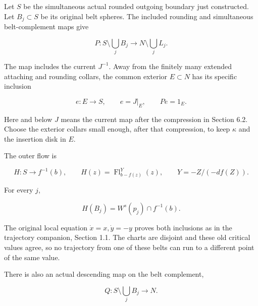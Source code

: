 Let \(S\) be the simultaneous actual rounded outgoing boundary just constructed. Let \(B_j\subset S\) be its original belt spheres. The included rounding and simultaneous belt-complement maps give

\begin{equation}
P:S\setminus\bigcup_jB_j
        \longrightarrow N\setminus\bigcup_jL_j.
 \label{courseIII:framed-handle-slides-and-index-one-removal:eq:6.7}
\end{equation}

The map includes the current \(J^{-1}\). Away from the finitely many extended attaching and rounding collars, the common exterior \(E\subset N\) has its specific inclusion

\begin{equation}
e:E\longrightarrow S,\qquad e=J|_E,
 \qquad Pe=1_E .
 \label{courseIII:framed-handle-slides-and-index-one-removal:eq:6.8}
\end{equation}

Here and below \(J\) means the current map after the compression in Section 6.2. Choose the exterior collars small enough, after that compression, to keep \(\kappa\) and the insertion disk in \(E\).

The outer flow is

\begin{equation}
H:S\longrightarrow f^{-1}(b),\qquad
 H(z)=\operatorname{Fl}^{Y}_{b-f(z)}(z),
 \qquad Y=-Z/(-df(Z)).
 \label{courseIII:framed-handle-slides-and-index-one-removal:eq:6.9}
\end{equation}

For every \(j\),

\begin{equation}
H(B_j)=W^s(p_j)\cap f^{-1}(b).
 \label{courseIII:framed-handle-slides-and-index-one-removal:eq:6.10}
\end{equation}

The original local equation \(\dot x=x,\dot y=-y\) proves both inclusions as in the trajectory companion, Section 1.1. The charts are disjoint and these old critical values agree, so no trajectory from one of these belts can run to a different point of the same value.

There is also an actual descending map on the belt complement,

\begin{equation}
Q:S\setminus\bigcup_jB_j\longrightarrow N.
 \label{courseIII:framed-handle-slides-and-index-one-removal:eq:6.11}
\end{equation}


